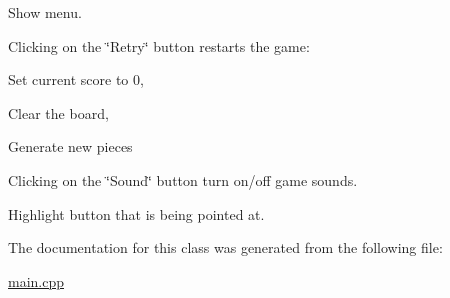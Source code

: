 Show menu.

Clicking on the \char`\"{}\+Retry\char`\"{} button restarts the game\+:

Set current score to 0,

Clear the board,

Generate new pieces

Clicking on the \char`\"{}\+Sound\char`\"{} button turn on/off game sounds.

Highlight button that is being pointed at.

The documentation for this class was generated from the following file\+:\begin{DoxyCompactItemize}
\item 
\mbox{\hyperlink{main_8cpp}{main.\+cpp}}\end{DoxyCompactItemize}
